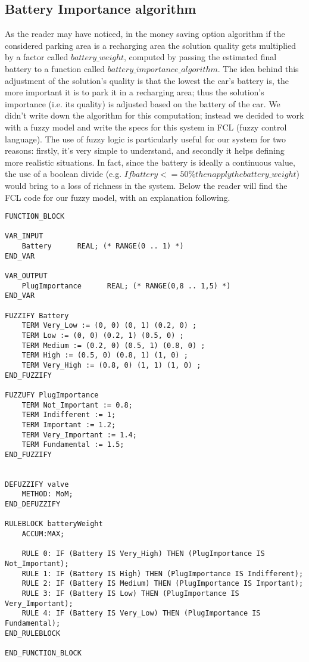 \subsection{Battery Importance algorithm}
As the reader may have noticed, in the money saving option algorithm if the considered parking area is a recharging area the solution quality gets multiplied by a factor called $battery\_weight$, computed by passing the estimated final battery to a function called $battery\_importance\_algorithm$. 
The idea behind this adjustment of the solution's quality is that the lowest the car's battery is, the more important it is to park it in a recharging area; thus the solution's importance (i.e. its quality) is adjusted based on the battery of the car. 
We didn't write down the algorithm for this computation; instead we decided to work with a fuzzy model and write the specs for this system in FCL (fuzzy control language). The use of fuzzy logic is particularly useful for our system for two reasons: firstly, it's very simple to understand, and secondly it helps defining more realistic situations. In fact, since the battery is ideally a continuous value, the use of a boolean divide (e.g. $If battery <=50\% then apply the battery\_weight$) would bring to a loss of richness in the system.
Below the reader will find the FCL code for our fuzzy model, with an explanation following.


\begin{verbatim}
FUNCTION_BLOCK

VAR_INPUT
    Battery      REAL; (* RANGE(0 .. 1) *) 
END_VAR

VAR_OUTPUT
    PlugImportance      REAL; (* RANGE(0,8 .. 1,5) *) 
END_VAR

FUZZIFY Battery
    TERM Very_Low := (0, 0) (0, 1) (0.2, 0) ;
    TERM Low := (0, 0) (0.2, 1) (0.5, 0) ;
    TERM Medium := (0.2, 0) (0.5, 1) (0.8, 0) ;
    TERM High := (0.5, 0) (0.8, 1) (1, 0) ;
    TERM Very_High := (0.8, 0) (1, 1) (1, 0) ;
END_FUZZIFY

FUZZUFY PlugImportance
    TERM Not_Important := 0.8;
    TERM Indifferent := 1;
    TERM Important := 1.2;
    TERM Very_Important := 1.4;
    TERM Fundamental := 1.5;
END_FUZZIFY


DEFUZZIFY valve 
    METHOD: MoM;
END_DEFUZZIFY

RULEBLOCK batteryWeight
    ACCUM:MAX;

    RULE 0: IF (Battery IS Very_High) THEN (PlugImportance IS Not_Important);
    RULE 1: IF (Battery IS High) THEN (PlugImportance IS Indifferent);
    RULE 2: IF (Battery IS Medium) THEN (PlugImportance IS Important);
    RULE 3: IF (Battery IS Low) THEN (PlugImportance IS Very_Important);
    RULE 4: IF (Battery IS Very_Low) THEN (PlugImportance IS Fundamental);
END_RULEBLOCK

END_FUNCTION_BLOCK
\end{verbatim}

